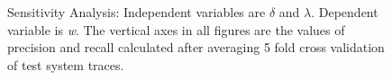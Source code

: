 \begin{figure}%
    \centering
    \qquad
    \caption{Sensitivity Analysis: Independent variables are $\delta$ and $\lambda$. Dependent variable is \textit{w}. The vertical axes in all figures are the values of precision and recall calculated after averaging 5 fold cross validation of test system traces.}%
    \label{fig:sensitivityAnalysis}%
\end{figure}

